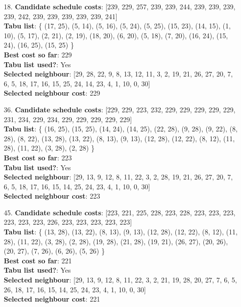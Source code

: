 \documentclass[fleqn]{article}
\begin{document}
\begin{itemize}
    \item[18.] \textbf{Candidate schedule costs}: [239, 229, 257, 239, 239, 244, 239, 239, 239, 239, 242, 239, 239, 239, 239, 239, 241] \\
    \textbf{Tabu list}: \{ (17, 25), (5, 14), (5, 16), (5, 24), (5, 25), (15, 23), (14, 15), (1, 10), (5, 17), (2, 21), (2, 19), (18, 20), (6, 20), (5, 18), (7, 20), (16, 24), (15, 24), (16, 25), (15, 25) \} \\
    \textbf{Best cost so far}: 229 \\
    \textbf{Tabu list used?}: Yes \\
    \textbf{Selected neighbour}: [29, 28, 22, 9, 8, 13, 12, 11, 3, 2, 19, 21, 26, 27, 20, 7, 6, 5, 18, 17, 16, 15, 25, 24, 14, 23, 4, 1, 10, 0, 30] \\
    \textbf{Selected neighbour cost}: 229
      

    \item[36.] \textbf{Candidate schedule costs}: [229, 229, 223, 232, 229, 229, 229, 229, 229, 231, 234, 229, 234, 229, 229, 229, 229, 229] \\
    \textbf{Tabu list}: \{ (16, 25), (15, 25), (14, 24), (14, 25), (22, 28), (9, 28), (9, 22), (8, 28), (8, 22), (13, 28), (13, 22), (8, 13), (9, 13), (12, 28), (12, 22), (8, 12), (11, 28), (11, 22), (3, 28), (2, 28) \} \\
    \textbf{Best cost so far}: 223 \\
    \textbf{Tabu list used?}: Yes \\
    \textbf{Selected neighbour}: [29, 13, 9, 12, 8, 11, 22, 3, 2, 28, 19, 21, 26, 27, 20, 7, 6, 5, 18, 17, 16, 15, 14, 25, 24, 23, 4, 1, 10, 0, 30] \\
    \textbf{Selected neighbour cost}: 223
      

    \item[45.] \textbf{Candidate schedule costs}: [223, 221, 225, 228, 223, 228, 223, 223, 223, 223, 223, 223, 226, 223, 223, 223, 223, 223] \\
    \textbf{Tabu list}: \{ (13, 28), (13, 22), (8, 13), (9, 13), (12, 28), (12, 22), (8, 12), (11, 28), (11, 22), (3, 28), (2, 28), (19, 28), (21, 28), (19, 21), (26, 27), (20, 26), (20, 27), (7, 26), (6, 26), (5, 26) \} \\
    \textbf{Best cost so far}: 221 \\
    \textbf{Tabu list used?}: Yes \\
    \textbf{Selected neighbour}: [29, 13, 9, 12, 8, 11, 22, 3, 2, 21, 19, 28, 20, 27, 7, 6, 5, 26, 18, 17, 16, 15, 14, 25, 24, 23, 4, 1, 10, 0, 30] \\
    \textbf{Selected neighbour cost}: 221
      


\end{itemize}
\end{document}
